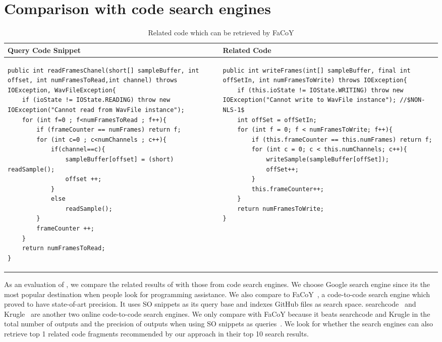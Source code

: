 \section{Comparison with code search engines}
\label{sec:comparison}

\lstset{
	frame=none,
	aboveskip=0pt,
	belowskip=0pt,
	basicstyle=\tiny\ttfamily,
}
\begin{table*}\scriptsize
	\caption{Related code which can be retrieved by FaCoY}
	\label{tab:facoy-example}
	
	\setlength{\tabcolsep}{0.01\textwidth}
	\begin{tabular}{@{}p{}p{}@{}}
		\toprule
		Query Code Snippet & Related Code \\
		\midrule


\begin{lstlisting}
public int readFramesChanel(short[] sampleBuffer, int offset, int numFramesToRead,int channel) throws IOException, WavFileException{
	if (ioState != IOState.READING) throw new IOException("Cannot read from WavFile instance");
	for (int f=0 ; f<numFramesToRead ; f++){
		if (frameCounter == numFrames) return f;
		for (int c=0 ; c<numChannels ; c++){
			if(channel==c){
				sampleBuffer[offset] = (short) readSample();
				offset ++;
			}
			else
				readSample();
		}
		frameCounter ++;
	}
	return numFramesToRead;
}
\end{lstlisting}
		
		&
\begin{lstlisting}
public int writeFrames(int[] sampleBuffer, final int offSetIn, int numFramesToWrite) throws IOException{
	if (this.ioState != IOState.WRITING) throw new IOException("Cannot write to WavFile instance"); //$NON-NLS-1$
	int offSet = offSetIn;
	for (int f = 0; f < numFramesToWrite; f++){
		if (this.frameCounter == this.numFrames) return f;
		for (int c = 0; c < this.numChannels; c++){
			writeSample(sampleBuffer[offSet]);
			offSet++;
		}
		this.frameCounter++;
	}
	return numFramesToWrite;
}
		
\end{lstlisting}
\\

\bottomrule
	\end{tabular}
\end{table*}
		

As an evaluation of {\tool}, we compare the related results of {\tool} with those from code search engines. We choose Google search engine since its the most popular destination when people look for programming assistance. We also compare to {\ttt FaCoY}~\cite{kim2018Facoy}, a code-to-code search engine which proved to have state-of-art precision. It uses SO snippets as its query base and indexes GitHub files as search space. {\ttt searchcode}~\cite{searchcode} and {\ttt Krugle}~\cite{krugle} are another two online code-to-code search engines. We only compare with {\ttt FaCoY} because it beats {\ttt searchcode} and {\ttt Krugle} in the total number of outputs and the precision of outputs when using SO snippets as queries~\cite{kim2018Facoy}. 
We look for whether the search engines can also retrieve top 1 related code fragments recommended by our approach in their top 10 search results. 

